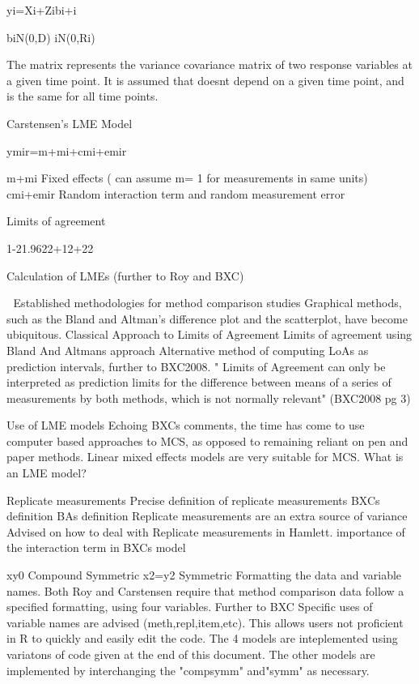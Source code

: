 yi=Xi+Zibi+i
 
biN(0,D)
iN(0,Ri)
 
 
The matrix  represents the variance covariance matrix of two response variables at a given time point.
It is assumed that  doesnt depend on a given time point, and is the same for all time points.
 
 
Carstensen's LME Model
 
ymir=m+mi+cmi+emir
 
m+mi    Fixed effects ( can assume m= 1 for measurements in same units)
cmi+emir      Random interaction term and random measurement error
 
 
Limits of agreement
 
 
1-21.9622+12+22

 


Calculation of LMEs (further to Roy and BXC)
 
 Established methodologies for method comparison studies
Graphical methods, such as the Bland and Altman's difference plot and the scatterplot, have become ubiquitous.
Classical Approach to Limits of Agreement
Limits of agreement using Bland And Altmans approach
Alternative method of computing LoAs as prediction intervals, further to BXC2008.
" Limits of Agreement can only be interpreted as prediction limits for the difference between means of a series of measurements by both methods, which is not normally relevant" (BXC2008 pg 3)
 
Use of LME models
Echoing BXCs comments, the time has come to use computer based approaches to MCS, as opposed to remaining reliant on pen and paper methods.
Linear mixed effects models are very suitable for MCS.
What is an LME model?
 
Replicate measurements
Precise definition of replicate measurements
BXCs definition
BAs definition
Replicate measurements are an extra source of variance
Advised on how to deal with Replicate measurements in Hamlett. 
importance of the interaction term in BXCs model
 
               xy0
Compound Symmetric     	x2=y2
Symmetric                        
Formatting the data and variable names.
Both Roy and Carstensen require that method comparison data follow a specified formatting, using four variables.
Further to BXC Specific uses of variable names are advised (meth,repl,item,etc).
This allows users not proficient in R to quickly and easily edit the code.
The 4 models are inteplemented using variatons of code given at the end of this document.
The other models are implemented by interchanging the "compsymm" and"symm" as necessary.
 
